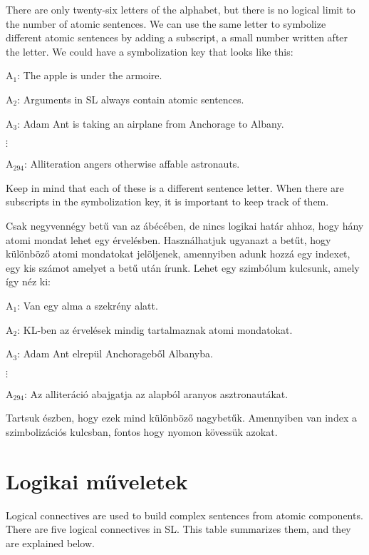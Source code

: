 

There are only twenty-six letters of the alphabet, but there is no logical limit to the number of atomic sentences. We can use the same letter to symbolize different atomic sentences by adding a subscript, a small number written after the letter. We could have a symbolization key that looks like this:
\begin{ekey}
\item[A$_1$:] The apple is under the armoire.
\item[A$_2$:] Arguments in SL always contain atomic sentences.
\item[A$_3$:] Adam Ant is taking an airplane from Anchorage to Albany.
\item[$\vdots$]
\item[A$_{294}$:] Alliteration angers otherwise affable astronauts.
\end{ekey}
Keep in mind that each of these is a different sentence letter. When there are subscripts in the symbolization key, it is important to keep track of them.

Csak negyvennégy betű van az ábécében, de nincs logikai határ ahhoz, hogy hány atomi mondat lehet egy érvelésben. Használhatjuk ugyanazt a betűt, hogy különböző atomi mondatokat jelöljenek, amennyiben adunk hozzá egy indexet, egy kis számot amelyet a betű után írunk. Lehet egy szimbólum kulcsunk, amely így néz ki:
\begin{ekey}
\item[A$_1$:] Van egy alma a szekrény alatt.
\item[A$_2$:] KL-ben az érvelések mindig tartalmaznak atomi mondatokat.
\item[A$_3$:] Adam Ant elrepül Anchorageből Albanyba.
\item[$\vdots$]
\item[A$_{294}$:] Az alliteráció abajgatja az alapból aranyos asztronautákat.
\end{ekey}
Tartsuk észben, hogy ezek mind különböző nagybetűk. Amennyiben van index a szimbolizációs kulcsban, fontos hogy nyomon kövessük azokat.


\section{Logikai műveletek}
Logical connectives are used to build complex sentences from atomic components. There are five logical connectives in SL. This table summarizes them, and they are explained below.


